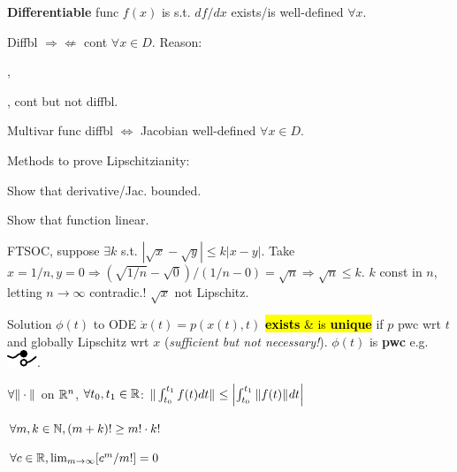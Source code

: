 \begin{Definition}
\textbf{Differentiable} func $f(x)$ is s.t. $df/dx$ exists/is well-defined $\forall x$.

Diffbl $\Rightarrow\nLeftarrow$ cont $\forall x\in D$. Reason: , , cont but not diffbl.

Multivar func diffbl $\Leftrightarrow$ Jacobian well-defined $\forall x\in D$.
\end{Definition}
\begin{Proof}
Methods to prove Lipschitzianity:
\begin{enumerate*}
  \item[\squaredcolornobord{M1}{yellow}] Show that derivative/Jac. bounded.
  \item[\squaredcolornobord{M2}{yellow}] Show that function linear.
  \item[\squaredcolornobord{M3}{yellow}] FTSOC, suppose $\exists k$ s.t. $|\sqrt x-\sqrt y|\le k|x-y|$. Take $x=1/n,y=0\Rightarrow(\sqrt{1/n}-\sqrt 0)/(1/n-0)=\sqrt n\Rightarrow\sqrt n\le k$. $k$ const in $n$, letting $n\to\infty$ contradic.! $\sqrt{x}$ not Lipschitz. \QED
\end{enumerate*}
\end{Proof}
\begin{Theorem}
Solution $\phi(t)$ to ODE $\dot x(t)=p(x(t),t)$ \hl{\textbf{exists} \& is \textbf{unique}} if $p$ pwc wrt $t$ and globally Lipschitz wrt $x$ (\textit{sufficient but not necessary!}). $\phi(t)$ is \textbf{pwc} e.g. \includegraphics[height=2ex]{figures/pwc.pdf}.
\end{Theorem}
\begin{Fact}
$\forall\|\cdot\|_{}$ on $\mathbb R^n$, $\forall t_0,t_1\in\mathbb R$: $\|\int_{t_0}^{t_1}f(t)dt\|_{}\le\left| \int_{t_0}^{t_1}\|f(t)\|_{}dt \right|$
\end{Fact}
\begin{itemize*}
  \item $\forall m,k\in\mathbb N,(m+k)!\ge m!\cdot k!$
  \item $\forall c\in\mathbb R,\lim_{m\to\infty}[c^m/m!]=0$
\end{itemize*}

